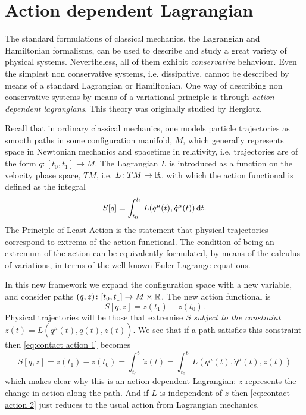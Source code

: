 \documentclass[../main.tex]{subfiles}
\begin{document}
\section{Action dependent Lagrangian}
The standard formulations of classical mechanics, the Lagrangian and Hamiltonian
formalisms, can be used to describe and study a great variety of physical systems.
Nevertheless, all of them exhibit \emph{conservative} behaviour. Even the simplest non
conservative systems, i.e. dissipative, cannot be described by means of a standard Lagrangian or
Hamiltonian. One way of describing non conservative systems by means of a variational
principle is through \emph{action-dependent lagrangians}. This theory was originally
studied by Herglotz.

Recall that in ordinary classical mechanics, one models particle trajectories as
smooth paths in some configuration manifold, \( M \), which generally represents space in
Newtonian mechanics and spacetime in relativity, i.e. trajectories are of the
form \( q \colon [t_0, t_1] \to M \). The Lagrangian \( L \) is introduced as a function on the
velocity phase space, \( TM \), i.e. \( L \colon TM \to \mathbb{R} \), with which the action
functional is defined as the integral
\begin{equation*}
	S[q] = \int_{t_0}^{t_1} L(q^\mu(t) , \dot{q}^\mu(t)) \,\mathrm{d} t. 
\end{equation*}
The Principle of Least Action is the statement that physical trajectories correspond to
extrema of the action functional. The condition of being an extremum of the action can be
equivalently formulated, by means of the calculus of variations, in terms of the
well-known Euler-Lagrange equations. 

In this new framework we expand the configuration space with a new variable, and consider
paths \( (q,z) \colon [t_0, t_1] \to M \times \mathbb{R} \). The new action functional is 
\begin{equation}\label{eq:contact action 1}
	S[q,z] = z(t_1) - z(t_0).
\end{equation}
Physical trajectories will be those that extremise \( S \) \emph{subject to the
constraint} \( \dot{z}(t) = L(q^\mu(t), \dot{q(t)}, z(t)) \). We see that if a path
satisfies this constraint then \cref{eq:contact action 1} becomes
\begin{equation}\label{eq:contact action 2}
	S[q,z] = z(t_1) - z(t_0) = \int_{t_0}^{t_1} \dot{z}(t) = \int_{t_0}^{t_1} L(q^\mu(t),
	\dot{q}^\mu(t), z(t))
\end{equation}
which makes clear why this is an action dependent Lagrangian: \( z \) represents the
change in action along the path. And if \( L \) is independent of \( z \) then
\cref{eq:contact action 2} just reduces to the usual action from Lagrangian mechanics. 
\end{document}
